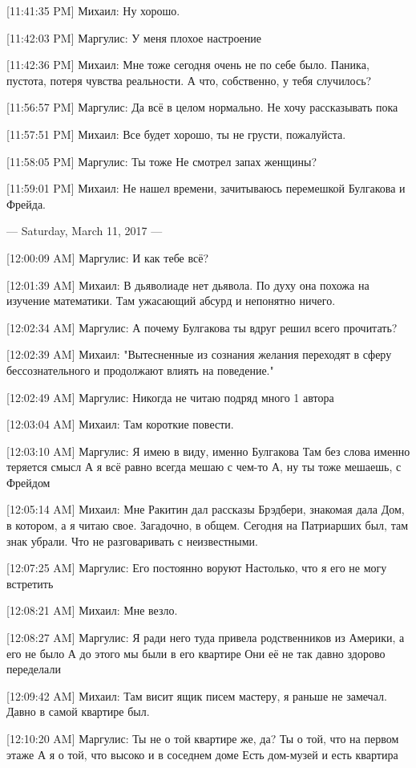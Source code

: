 \documentclass{article}
\begin{document}
[11:41:35 PM] Михаил:
Ну хорошо.

[11:42:03 PM] Маргулис:
У меня плохое настроение

[11:42:36 PM] Михаил:
Мне тоже сегодня очень не по себе было.
 Паника, пустота, потеря чувства реальности.
 А что, собственно, у тебя случилось?

[11:56:57 PM] Маргулис:
Да всё в целом нормально.
 Не хочу рассказывать пока

[11:57:51 PM] Михаил:
Все будет хорошо, ты не грусти, пожалуйста.

[11:58:05 PM] Маргулис:
Ты тоже
 Не смотрел запах женщины?

[11:59:01 PM] Михаил:
Не нашел времени, зачитываюсь перемешкой Булгакова и Фрейда.

--- Saturday, March 11, 2017 ---

[12:00:09 AM] Маргулис:
И как тебе всё?

[12:01:39 AM] Михаил:
В дьяволиаде нет дьявола. По духу она похожа на изучение математики. Там ужасающий абсурд и непонятно ничего.

[12:02:34 AM] Маргулис:
А почему Булгакова ты вдруг решил всего прочитать?

[12:02:39 AM] Михаил:
"Вытесненные из сознания желания переходят в сферу бессознательного и продолжают влиять на поведение."

[12:02:49 AM] Маргулис:
Никогда не читаю подряд много 1 автора

[12:03:04 AM] Михаил:
Там короткие повести.

[12:03:10 AM] Маргулис:
Я имею в виду, именно Булгакова
 Там без слова именно теряется смысл
 А я всё равно всегда мешаю с чем-то
 А, ну ты тоже мешаешь, с Фрейдом

[12:05:14 AM] Михаил:
Мне Ракитин дал рассказы Брэдбери, знакомая дала Дом, в котором, а я читаю свое.
 Загадочно, в общем.
 Сегодня на Патриарших был, там знак убрали.
 Что не разговаривать с неизвестными.

[12:07:25 AM] Маргулис:
Его постоянно воруют
 Настолько, что я его не могу встретить

[12:08:21 AM] Михаил:
Мне везло.

[12:08:27 AM] Маргулис:
Я ради него туда привела родственников из Америки, а его не было
 А до этого мы были в его квартире
 Они её не так давно здорово переделали

[12:09:42 AM] Михаил:
Там висит ящик писем мастеру, я раньше не замечал.
 Давно в самой квартире был.

[12:10:20 AM] Маргулис:
Ты не о той квартире же, да?
 Ты о той, что на первом этаже
 А я о той, что высоко и в соседнем доме
 Есть дом-музей и есть квартира
\end{document}
